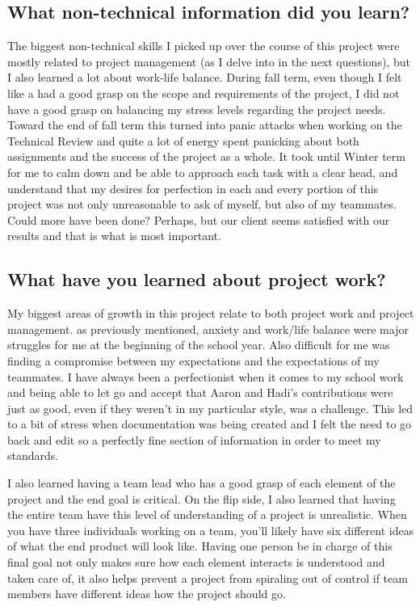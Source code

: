 \documentclass[onecolumn, draftclsnofoot,10pt, compsoc]{report}
\begin{document}
\subsection{What non-technical information did you learn?}
The biggest non-technical skills I picked up over the course of this project were mostly related to project management (as I delve into in the next questions), but I also learned a lot about work-life balance. During fall term, even though I felt like a had a good grasp on the scope and requirements of the project, I did not have a good grasp on balancing my stress levels regarding the project needs. Toward the end of fall term this turned into panic attacks when working on the Technical Review and quite a lot of energy spent panicking about both assignments and the success of the project as a whole. It took until Winter term for me to calm down and be able to approach each task with a clear head, and understand that my desires for perfection in each and every portion of this project was not only unreasonable to ask of myself, but also of my teammates. Could more have been done? Perhaps, but our client seems satisfied with our results and that is what is most important. 

\subsection{What have you learned about project work?}
My biggest areas of growth in this project relate to both project work and project management. as previously mentioned, anxiety and work/life balance were major struggles for me at the beginning of the school year. Also difficult for me was finding a compromise between my expectations and the expectations of my teammates. I have always been a perfectionist when it comes to my school work and being able to let go and accept that Aaron and Hadi's contributions were just as good, even if they weren't in my particular style, was a challenge. This led to a bit of stress when documentation was being created and I felt the need to go back and edit so a perfectly fine section of information in  order to meet my standards.

I also learned having a team lead who has a good grasp of each element of the project and the end goal is critical. On the flip side, I also learned that having the entire team have this level of understanding of a project is unrealistic. When you have three individuals working on a team, you'll likely have six different ideas of what the end product will look like. Having one person be in charge of this final goal not only makes sure how each element interacts is understood and taken care of, it also helps prevent a project from spiraling out of control if team members have different ideas how the project should go. 
\end{document}

